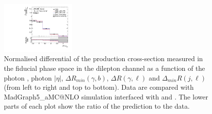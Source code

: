 \begin{figure}[ht]
  \includegraphics[width=0.33\textwidth]{figures/diff_xsec/normalized-unfolded-distributions/tty_prod_dilep/DL_tty_prod_drlj_unfolded_normalized.pdf}%
  \caption{Normalised differential of the \tty production 
  cross-section measured in the fiducial phase space in the dilepton channel as
  a function of the photon \pt, photon $|\eta|$, $\Delta R_{min} (\gamma, b)$,
  $\Delta R (\gamma, \ell)$ and $\Delta_{min} R (j, \ell)$ (from left to right
  and top to bottom). Data are compared with MadGraph5\_aMC@NLO simulation
  interfaced with \PYTHIA[8] and \HERWIG[7]. The lower parts of each plot show
  the ratio of the prediction to the data.}
  \label{fig:tty_prod_diff_DL1_norm}
\end{figure}
\FloatBarrier


